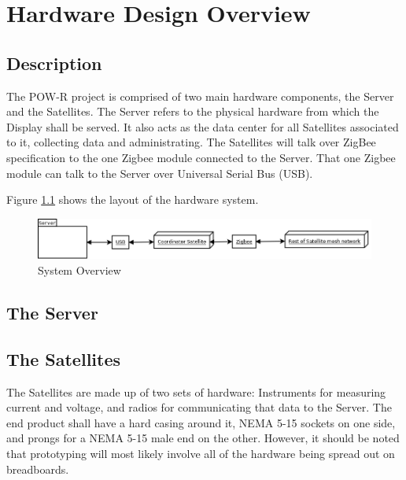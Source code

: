 
\chapter{Hardware Design Overview}

\section{Description}

The POW-R project is comprised of two main hardware components, the Server and the Satellites. 
The Server refers to the physical hardware from which the Display shall be served. 
It also acts as the data center for all Satellites associated to it, collecting data and administrating. 
The Satellites will talk over ZigBee specification to the one Zigbee module connected to the Server. 
That one Zigbee module can talk to the Server over Universal Serial Bus (USB).
 
Figure \ref{SystemOverview} shows the layout of the hardware system.
\begin{figure}[H]
\centering
\includegraphics[scale=0.3]{Hardware/images/SystemOverview.png}
\caption{System Overview}
\label{SystemOverview}
\end{figure}

\section{The Server}





\section{The Satellites}
The Satellites are made up of two sets of hardware: 
Instruments for measuring current and voltage, and radios for communicating that data to the Server. 
The end product shall have a hard casing around it, NEMA 5-15 sockets on one side, and prongs for a NEMA 5-15 male end on the other. 
However, it should be noted that prototyping will most likely involve all of the hardware being spread out on breadboards.




